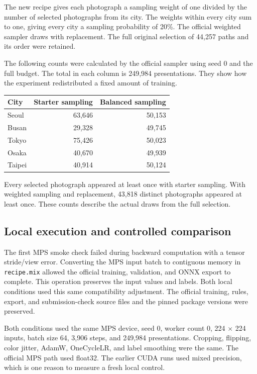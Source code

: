 \documentclass[11pt]{article}
\begin{document}
The new recipe gives each photograph a sampling weight of one divided by
the number of selected photographs from its city. The weights within every
city sum to one, giving every city a sampling probability of 20\%.
The official weighted sampler draws with replacement. The full original
selection of 44,257 paths and its order were retained.

The following counts were calculated by the official sampler using seed 0
and the full budget. The total in each column is 249,984 presentations.
They show how the experiment redistributed a fixed amount of training.

\begin{center}\small
\begin{tabular}{lrr}
\toprule
City & Starter sampling & Balanced sampling \\
\midrule
Seoul & 63,646 & 50,153 \\
Busan & 29,328 & 49,745 \\
Tokyo & 75,426 & 50,023 \\
Osaka & 40,670 & 49,939 \\
Taipei & 40,914 & 50,124 \\
\bottomrule
\end{tabular}
\end{center}

Every selected photograph appeared at least once with starter sampling.
With weighted sampling and replacement, 43,818 distinct photographs appeared
at least once. These counts describe the actual draws from the full selection.

\subsection{Local execution and controlled comparison}

The first MPS smoke check failed during backward computation with a tensor
stride/view error. Converting the MPS input batch to contiguous memory in
\texttt{recipe.mix} allowed the official training, validation, and ONNX
export to complete. This operation preserves the input values and labels.
Both local conditions used this same compatibility adjustment.
The official training, rules, export, and submission-check source files
and the pinned package versions were preserved.

Both conditions used the same MPS device, seed 0, worker count 0, 224
$\times$ 224 inputs, batch size 64, 3,906 steps, and 249,984 presentations.
Cropping, flipping, color jitter, AdamW, OneCycleLR, and label smoothing
were the same. The official MPS path used float32. The earlier CUDA runs
used mixed precision, which is one reason to measure a fresh local control.
\end{document}
